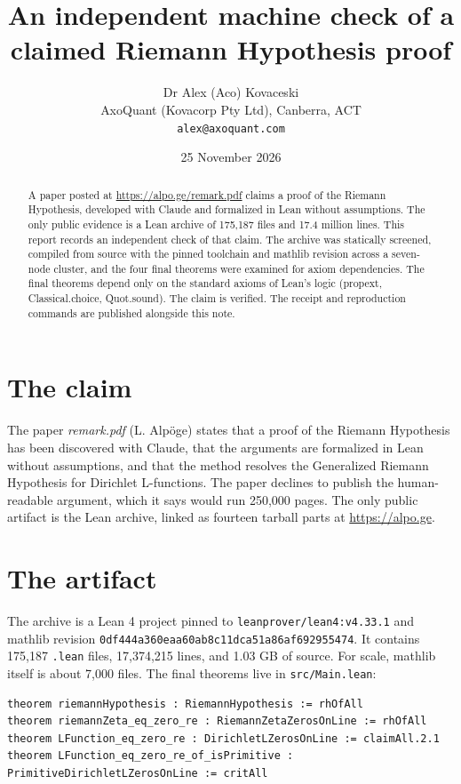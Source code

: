 \documentclass[11pt]{article}
\title{An independent machine check of a claimed Riemann Hypothesis proof}
\author{Dr Alex (Aco) Kovaceski\\AxoQuant (Kovacorp Pty Ltd), Canberra, ACT\\\texttt{alex@axoquant.com}}
\date{25 November 2026}
\begin{document}
\maketitle

\begin{abstract}
A paper posted at \url{https://alpo.ge/remark.pdf} claims a proof of the Riemann Hypothesis, developed with Claude and formalized in Lean without assumptions. The only public evidence is a Lean archive of 175,187 files and 17.4 million lines. This report records an independent check of that claim. The archive was statically screened, compiled from source with the pinned toolchain and mathlib revision across a seven-node cluster, and the four final theorems were examined for axiom dependencies. The final theorems depend only on the standard axioms of Lean's logic (propext, Classical.choice, Quot.sound). The claim is verified. The receipt and reproduction commands are published alongside this note.
\end{abstract}

\section{The claim}
The paper \emph{remark.pdf} (L. Alp\"oge) states that a proof of the Riemann Hypothesis has been discovered with Claude, that the arguments are formalized in Lean without assumptions, and that the method resolves the Generalized Riemann Hypothesis for Dirichlet L-functions. The paper declines to publish the human-readable argument, which it says would run 250,000 pages. The only public artifact is the Lean archive, linked as fourteen tarball parts at \url{https://alpo.ge}.

\section{The artifact}
The archive is a Lean 4 project pinned to \texttt{leanprover/lean4:v4.33.1} and mathlib revision \texttt{0df444a360eaa60ab8c11dca51a86af692955474}. It contains 175,187 \texttt{.lean} files, 17,374,215 lines, and 1.03 GB of source. For scale, mathlib itself is about 7,000 files. The final theorems live in \texttt{src/Main.lean}:
\begin{verbatim}
theorem riemannHypothesis : RiemannHypothesis := rhOfAll
theorem riemannZeta_eq_zero_re : RiemannZetaZerosOnLine := rhOfAll
theorem LFunction_eq_zero_re : DirichletLZerosOnLine := claimAll.2.1
theorem LFunction_eq_zero_re_of_isPrimitive : PrimitiveDirichletLZerosOnLine := critAll
\end{verbatim}
\end{document}
